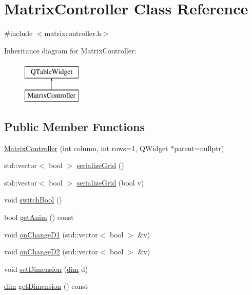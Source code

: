 \hypertarget{class_matrix_controller}{}\section{Matrix\+Controller Class Reference}
\label{class_matrix_controller}


{\ttfamily \#include $<$matrixcontroller.\+h$>$}

Inheritance diagram for Matrix\+Controller\+:\begin{figure}[H]
\begin{center}
\leavevmode
\includegraphics[height=2.000000cm]{class_matrix_controller}
\end{center}
\end{figure}
\subsection*{Public Member Functions}
\begin{DoxyCompactItemize}
\item 
\mbox{\hyperlink{class_matrix_controller_a9b3730013aece0bd3f8cbb28342d091a}{Matrix\+Controller}} (int column, int rows=1, Q\+Widget $\ast$parent=nullptr)
\item 
std\+::vector$<$ bool $>$ \mbox{\hyperlink{class_matrix_controller_a2d83853b18c33b5e9c5d9cda58b69640}{serialize\+Grid}} ()
\item 
std\+::vector$<$ bool $>$ \mbox{\hyperlink{class_matrix_controller_ad746a208e6b2f5ddad05d9da559149d1}{serialize\+Grid}} (bool v)
\item 
void \mbox{\hyperlink{class_matrix_controller_aa2edebadd4baa22559dda6a44a334f7e}{switch\+Bool}} ()
\item 
bool \mbox{\hyperlink{class_matrix_controller_a3dddffef3dba0b1ec308c328c23c2133}{get\+Anim}} () const
\item 
void \mbox{\hyperlink{class_matrix_controller_a9cfa49cb2567dabbf7c333ec7384d15f}{on\+Change\+D1}} (std\+::vector$<$ bool $>$ \&v)
\item 
void \mbox{\hyperlink{class_matrix_controller_a1b0fa2f1568ac4149a27e2695bf55cab}{on\+Change\+D2}} (std\+::vector$<$ bool $>$ \&v)
\item 
void \mbox{\hyperlink{class_matrix_controller_a19a8d008de9323a306daac5aae96ce76}{set\+Dimension}} (\mbox{\hyperlink{automatamanager_8h_ae6fa959b9e8f9c638e0d82bf2c7dc5e7}{dim}} d)
\item 
\mbox{\hyperlink{automatamanager_8h_ae6fa959b9e8f9c638e0d82bf2c7dc5e7}{dim}} \mbox{\hyperlink{class_matrix_controller_a0c6581133615470c77b738737094d7e9}{get\+Dimension}} () const
\end{DoxyCompactItemize}

